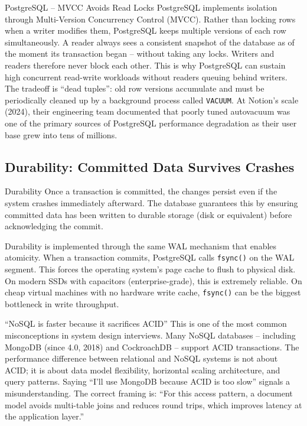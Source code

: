 \documentclass[11pt,a4paper]{article}
\begin{document}
\begin{industrybox}{PostgreSQL -- MVCC Avoids Read Locks}
PostgreSQL implements isolation through Multi-Version Concurrency Control (MVCC). Rather than locking rows when a writer modifies them, PostgreSQL keeps multiple versions of each row simultaneously. A reader always sees a consistent snapshot of the database as of the moment its transaction began -- without taking any locks. Writers and readers therefore never block each other. This is why PostgreSQL can sustain high concurrent read-write workloads without readers queuing behind writers. The tradeoff is ``dead tuples'': old row versions accumulate and must be periodically cleaned up by a background process called \texttt{VACUUM}. At Notion's scale (2024), their engineering team documented that poorly tuned autovacuum was one of the primary sources of PostgreSQL performance degradation as their user base grew into tens of millions.
\end{industrybox}

\subsection{Durability: Committed Data Survives Crashes}

\begin{termbox}{Durability}
Once a transaction is committed, the changes persist even if the system crashes immediately afterward. The database guarantees this by ensuring committed data has been written to durable storage (disk or equivalent) before acknowledging the commit.
\end{termbox}

Durability is implemented through the same WAL mechanism that enables atomicity. When a transaction commits, PostgreSQL calls \texttt{fsync()} on the WAL segment. This forces the operating system's page cache to flush to physical disk. On modern SSDs with capacitors (enterprise-grade), this is extremely reliable. On cheap virtual machines with no hardware write cache, \texttt{fsync()} can be the biggest bottleneck in write throughput.

\begin{trapbox}{``NoSQL is faster because it sacrifices ACID''}
This is one of the most common misconceptions in system design interviews. Many NoSQL databases -- including MongoDB (since 4.0, 2018) and CockroachDB -- support ACID transactions. The performance difference between relational and NoSQL systems is not about ACID; it is about data model flexibility, horizontal scaling architecture, and query patterns. Saying ``I'll use MongoDB because ACID is too slow'' signals a misunderstanding. The correct framing is: ``For this access pattern, a document model avoids multi-table joins and reduces round trips, which improves latency at the application layer.''
\end{trapbox}
\end{document}
